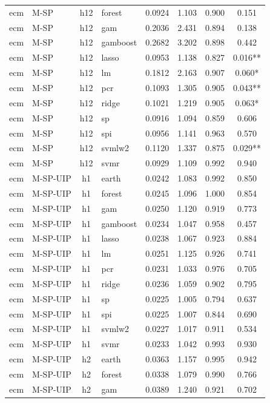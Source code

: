 \begin{ThreePartTable}
\begin{longtable}[t]{llclcccc}
ecm & M-SP & h12 & forest & 0.0924 & 1.103 & 0.900 & 0.151\\
ecm & M-SP & h12 & gam & 0.2036 & 2.431 & 0.894 & 0.138\\
ecm & M-SP & h12 & gamboost & 0.2682 & 3.202 & 0.898 & 0.442\\
ecm & M-SP & h12 & lasso & 0.0953 & 1.138 & 0.827 & 0.016**\\
ecm & M-SP & h12 & lm & 0.1812 & 2.163 & 0.907 & 0.060*\\
ecm & M-SP & h12 & pcr & 0.1093 & 1.305 & 0.905 & 0.043**\\
ecm & M-SP & h12 & ridge & 0.1021 & 1.219 & 0.905 & 0.063*\\
ecm & M-SP & h12 & sp & 0.0916 & 1.094 & 0.859 & 0.606\\
ecm & M-SP & h12 & spi & 0.0956 & 1.141 & 0.963 & 0.570\\
ecm & M-SP & h12 & svmlw2 & 0.1120 & 1.337 & 0.875 & 0.029**\\
ecm & M-SP & h12 & svmr & 0.0929 & 1.109 & 0.992 & 0.940\\
\addlinespace
ecm & M-SP-UIP & h1 & earth & 0.0242 & 1.083 & 0.992 & 0.850\\
ecm & M-SP-UIP & h1 & forest & 0.0245 & 1.096 & 1.000 & 0.854\\
ecm & M-SP-UIP & h1 & gam & 0.0250 & 1.120 & 0.919 & 0.773\\
ecm & M-SP-UIP & h1 & gamboost & 0.0234 & 1.047 & 0.958 & 0.457\\
ecm & M-SP-UIP & h1 & lasso & 0.0238 & 1.067 & 0.923 & 0.884\\
ecm & M-SP-UIP & h1 & lm & 0.0251 & 1.125 & 0.926 & 0.741\\
ecm & M-SP-UIP & h1 & pcr & 0.0231 & 1.033 & 0.976 & 0.705\\
ecm & M-SP-UIP & h1 & ridge & 0.0236 & 1.059 & 0.902 & 0.795\\
ecm & M-SP-UIP & h1 & sp & 0.0225 & 1.005 & 0.794 & 0.637\\
ecm & M-SP-UIP & h1 & spi & 0.0225 & 1.007 & 0.844 & 0.690\\
ecm & M-SP-UIP & h1 & svmlw2 & 0.0227 & 1.017 & 0.911 & 0.534\\
ecm & M-SP-UIP & h1 & svmr & 0.0233 & 1.042 & 0.993 & 0.930\\
\addlinespace
ecm & M-SP-UIP & h2 & earth & 0.0363 & 1.157 & 0.995 & 0.942\\
ecm & M-SP-UIP & h2 & forest & 0.0338 & 1.079 & 0.990 & 0.766\\
ecm & M-SP-UIP & h2 & gam & 0.0389 & 1.240 & 0.921 & 0.702\\

\end{longtable}
\end{ThreePartTable}
